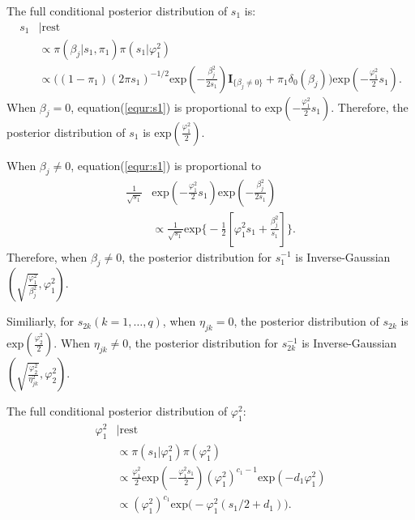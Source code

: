 \documentclass[12pt]{article}
\begin{document}
The full conditional posterior distribution of $s_1$ is:
\begin{equation}\label{equr:s1}
\begin{aligned}
s_{1}&|\text{rest} \\
&\propto \pi(\beta_{j}|s_1,\pi_1) \pi(s_1|\varphi_{1}^{2})\\
&\propto\Big( (1-\pi_1)(2\pi s_1)^{-1/2} \text{exp}(-\frac{\beta_{j}^{2}}{2 s_1})\textbf{I}_{\{\beta_{j} \neq 0\}} + \pi_1 \delta_0(\beta_{j})  \Big)  \text{exp}(-\frac{\varphi_{1}^{2}}{2} s_1).
\end{aligned}
\end{equation}
When $\beta_j = 0$, equation(\ref{equr:s1}) is proportional to $\text{exp}(-\frac{\varphi_{1}^{2}}{2} s_1)$. Therefore, the posterior distribution of $s_1$ is $\text{exp}(\frac{\varphi_{1}^{2}}{2})$.\par
When $\beta_j \neq 0$, equation(\ref{equr:s1}) is proportional to 
\begin{equation*}
\begin{aligned}
\frac{1}{\sqrt{s_1}} &\text{exp}(-\frac{\varphi_{1}^{2}}{2} s_1) \text{exp}(-\frac{\beta_{j}^{2}}{2 s_1})\\
&\propto \frac{1}{\sqrt{s_1}} \text{exp} \Big\{ -\frac{1}{2}[\varphi_{1}^{2} s_1 + \frac{\beta_{j}^{2}}{s_1} ]  \}.
\end{aligned}
\end{equation*}
Therefore, when $\beta_j \neq 0$, the posterior distribution for $s_1^{-1}$ is Inverse-Gaussian$(\sqrt{\frac{\varphi_1^2}{\beta_j^2}}, \varphi_1^2)$.\par
Similiarly, for $s_{2k} (k=1,\dots,q)$, when $\eta_{jk} = 0$, the posterior distribution of $s_{2k}$ is $\text{exp}(\frac{\varphi_{2}^{2}}{2})$. When $\eta_{jk} \neq 0$, the posterior distribution for $s_{2k}^{-1}$ is Inverse-Gaussian$(\sqrt{\frac{\varphi_2^2}{\eta_{jk}^2}}, \varphi_2^2)$.\par
The full conditional posterior distribution of $\varphi_1^2$:
\begin{equation*}
\begin{aligned}
\varphi_1^2&|\text{rest} \\
&\propto \pi(s_1|\varphi_1^2)\pi(\varphi_1^2)\\
&\propto \frac{\varphi_1^2}{2} \text{exp}(-\frac{\varphi_1^2 s_1}{2})(\varphi_1^2)^{c_1-1}\text{exp}(-d_1\varphi_1^2)\\
&\propto (\varphi_1^2)^{c_1} \text{exp}\Big(- \varphi_1^2(s_1/2+d_1)\Big).
\end{aligned}
\end{equation*}
\end{document}
